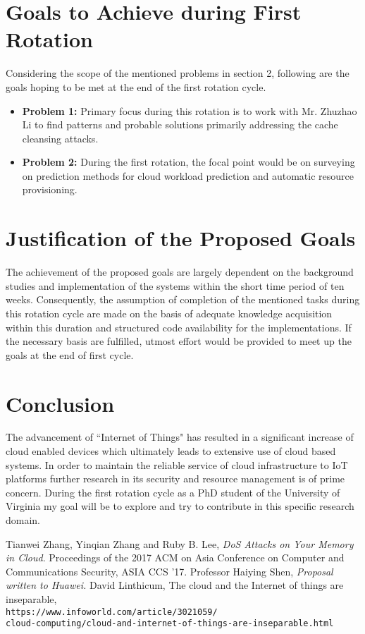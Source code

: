 \documentclass[a4paper,10pt]{article}
\begin{document}
\smallskip
\section{Goals to Achieve during First Rotation}
Considering the scope of the mentioned problems in section 2, following are the goals hoping to be met at the end of the first rotation cycle.

\begin{itemize}
    \item \textbf{Problem 1:} Primary focus during this rotation is to work with Mr. Zhuzhao Li to find patterns and probable solutions primarily addressing the cache cleansing attacks.
    \item \textbf{Problem 2:} During the first rotation, the focal point would be on surveying on prediction methods for cloud workload prediction and automatic resource provisioning.
\end{itemize}

\smallskip

\section{Justification of the Proposed Goals}
The achievement of the proposed goals are largely dependent on the background studies and implementation of the systems within the short time period of ten weeks. Consequently, the assumption of completion of the mentioned tasks during this rotation cycle are made on the basis of adequate knowledge acquisition within this duration and structured code availability for the implementations. If the necessary basis are fulfilled, utmost effort would be provided to meet up the goals at the end of first cycle.

\smallskip

\section{Conclusion}
The advancement of “Internet of Things" has resulted in a significant increase of cloud enabled devices which ultimately leads to extensive use of cloud based systems. In order to maintain the reliable service of cloud infrastructure to IoT platforms further research in its security and resource management is of prime concern. During the first rotation cycle as a PhD student of the University of Virginia my goal will be to explore and try to contribute in this specific research domain.  

\begin{thebibliography}{9}
Tianwei Zhang, Yinqian Zhang and Ruby B. Lee,  \textit{DoS Attacks on Your Memory in Cloud}. Proceedings of the 2017 ACM on Asia Conference on Computer and Communications Security, ASIA CCS '17.
 Professor Haiying Shen, \textit{Proposal written to Huawei.}
 David Linthicum, The cloud and the Internet of things are inseparable,\\\texttt{https://www.infoworld.com/article/3021059/\\cloud-computing/cloud-and-internet-of-things-are-inseparable.html}
\end{thebibliography}
\end{document}
